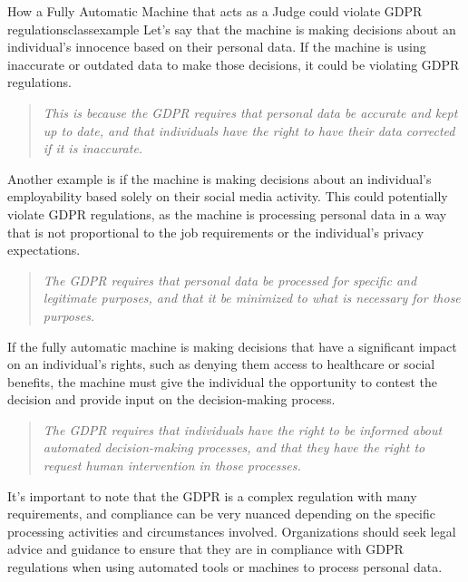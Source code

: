 \documentclass{article}
\begin{document}
\begin{class}{How a Fully Automatic Machine that acts as a Judge could violate GDPR regulations}{classexample}
  Let’s say that the machine is making decisions about an individual’s innocence based on their personal data. 
  If the machine is using inaccurate or outdated data to make those decisions, it could be violating GDPR regulations. 
  
  \begin{quote}
    \textit{This is because the GDPR requires that personal data be accurate and kept up to date, and that individuals have 
    the right to have their data corrected if it is inaccurate.}
  \end{quote}

  Another example is if the machine is making decisions about an individual’s employability based solely on their 
  social media activity. This could potentially violate GDPR regulations, as the machine is processing personal data 
  in a way that is not proportional to the job requirements or the individual’s privacy expectations. 
  \begin{quote}
    \textit{The GDPR requires that personal data be processed for specific and legitimate purposes, and that 
    it be minimized to what is necessary for those purposes.}
  \end{quote}
  
  If the fully automatic machine is making decisions that have a significant impact on an individual’s rights, 
  such as denying them access to healthcare or social benefits, the machine must give the individual the opportunity 
  to contest the decision and provide input on the decision-making process. 

  \begin{quote}
    \textit{The GDPR requires that individuals 
    have the right to be informed about automated decision-making processes, and that 
    they have the right to request human intervention in those processes.}
  \end{quote}
\end{class}

It’s important to note that the GDPR is a complex regulation with many requirements, and compliance can be very nuanced depending on the specific processing activities and circumstances involved. Organizations should seek legal advice and guidance to ensure that they are in compliance with GDPR regulations when using automated tools or machines to process personal data.
\end{document}
